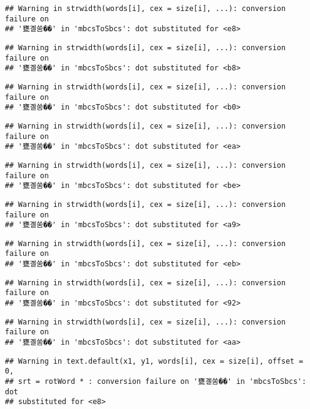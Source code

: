 \documentclass[]{article}
\begin{document}
\begin{verbatim}
## Warning in strwidth(words[i], cex = size[i], ...): conversion failure on
## '甕곌쑴��' in 'mbcsToSbcs': dot substituted for <e8>
\end{verbatim}

\begin{verbatim}
## Warning in strwidth(words[i], cex = size[i], ...): conversion failure on
## '甕곌쑴��' in 'mbcsToSbcs': dot substituted for <b8>
\end{verbatim}

\begin{verbatim}
## Warning in strwidth(words[i], cex = size[i], ...): conversion failure on
## '甕곌쑴��' in 'mbcsToSbcs': dot substituted for <b0>
\end{verbatim}

\begin{verbatim}
## Warning in strwidth(words[i], cex = size[i], ...): conversion failure on
## '甕곌쑴��' in 'mbcsToSbcs': dot substituted for <ea>
\end{verbatim}

\begin{verbatim}
## Warning in strwidth(words[i], cex = size[i], ...): conversion failure on
## '甕곌쑴��' in 'mbcsToSbcs': dot substituted for <be>
\end{verbatim}

\begin{verbatim}
## Warning in strwidth(words[i], cex = size[i], ...): conversion failure on
## '甕곌쑴��' in 'mbcsToSbcs': dot substituted for <a9>
\end{verbatim}

\begin{verbatim}
## Warning in strwidth(words[i], cex = size[i], ...): conversion failure on
## '甕곌쑴��' in 'mbcsToSbcs': dot substituted for <eb>
\end{verbatim}

\begin{verbatim}
## Warning in strwidth(words[i], cex = size[i], ...): conversion failure on
## '甕곌쑴��' in 'mbcsToSbcs': dot substituted for <92>
\end{verbatim}

\begin{verbatim}
## Warning in strwidth(words[i], cex = size[i], ...): conversion failure on
## '甕곌쑴��' in 'mbcsToSbcs': dot substituted for <aa>
\end{verbatim}

\begin{verbatim}
## Warning in text.default(x1, y1, words[i], cex = size[i], offset = 0,
## srt = rotWord * : conversion failure on '甕곌쑴��' in 'mbcsToSbcs': dot
## substituted for <e8>
\end{verbatim}
\end{document}
